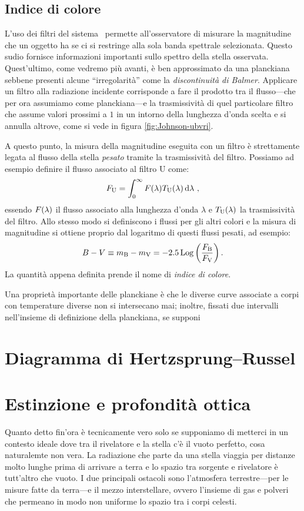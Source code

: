     \subsection{Indice di colore}
        L'uso dei filtri del sistema \ubvri\ permette all'osservatore di misurare la magnitudine che un oggetto ha se ci si restringe alla sola banda spettrale selezionata. Questo sudio fornisce informazioni importanti sullo spettro della stella osservata. Quest'ultimo, come vedremo più avanti, è ben approssimato da una planckiana sebbene presenti alcune ``irregolarità'' come la \emph{discontinuità di Balmer}. Applicare un filtro alla radiazione incidente corrisponde a fare il prodotto tra il flusso---che per ora assumiamo come planckiana---e la trasmissività di quel particolare filtro che assume valori prossimi a $\num{1}$ in un intorno della lunghezza d'onda scelta e si annulla altrove, come si vede in figura \ref{fig:Johnson-ubvri}.

        A questo punto, la misura della magnitudine eseguita con un filtro è strettamente legata al flusso della stella \emph{pesato} tramite la trasmissività del filtro. Possiamo ad esempio definire il flusso associato al filtro U come:
        \begin{equation*}
            F_{\text{U}} = \int_{0}^{\infty} F\pqty{\lambda}T_{\text{U}}\pqty{\lambda}\dd{\lambda}
            \mycomma
        \end{equation*}
        essendo $F\pqty{\lambda}$ il flusso associato alla lunghezza d'onda $\lambda$ e $T_{\text{U}}\pqty{\lambda}$ la trasmissività del filtro. Allo stesso modo si definiscono i flussi per gli altri colori e la misura di magnitudine si ottiene proprio dal logaritmo di questi flussi pesati, ad esempio:
        \begin{equation}
            B - V \equiv m_{\text{B}} - m_{\text{V}} = -\num{2.5}\Log\pqty{\frac{F_{\text{B}}}{F_{\text{V}}}}
            \myperiod
        \end{equation}
        La quantità appena definita prende il nome di \emph{indice di colore}.
        
        Una proprietà importante delle planckiane è che le diverse curve associate a corpi con temperature diverse non si intersecano mai; inoltre, fissati due intervalli nell'insieme di definizione della planckiana, se supponi
\section{Diagramma di Hertzsprung--Russel}
\section{Estinzione e profondità ottica}
    Quanto detto fin'ora è tecnicamente vero solo se supponiamo di metterci in un contesto ideale dove tra il rivelatore e la stella c'è il vuoto perfetto, cosa naturalemte non vera. La radiazione che parte da una stella viaggia per distanze molto lunghe prima di arrivare a terra e lo spazio tra sorgente e rivelatore è tutt'altro che vuoto. I due principali ostacoli sono l'atmosfera terrestre---per le misure fatte da terra---e il mezzo interstellare, ovvero l'insieme di gas e polveri che permeano in modo non uniforme lo spazio tra i corpi celesti.

